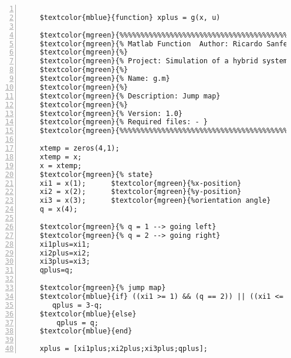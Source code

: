 %  
%  
%  
%  
  
  
\DefineShortVerb[fontfamily=courier,fontseries=m]{\$} 
\DefineShortVerb[fontfamily=courier,fontseries=b]{\#} 
  
\begin{Verbatim}[commandchars=\$\{\},numbers=left,numbersep=2pt] 

    $textcolor{mblue}{function} xplus = g(x, u) 
     
    $textcolor{mgreen}{%%%%%%%%%%%%%%%%%%%%%%%%%%%%%%%%%%%%%%%%%%%%%%%%%%%%%%%%%%%%%%%%%%%%%%%%%%%} 
    $textcolor{mgreen}{% Matlab Function  Author: Ricardo Sanfelice} 
    $textcolor{mgreen}{%} 
    $textcolor{mgreen}{% Project: Simulation of a hybrid system (Vehicle Traveling on a Track)} 
    $textcolor{mgreen}{%} 
    $textcolor{mgreen}{% Name: g.m} 
    $textcolor{mgreen}{%} 
    $textcolor{mgreen}{% Description: Jump map} 
    $textcolor{mgreen}{%} 
    $textcolor{mgreen}{% Version: 1.0} 
    $textcolor{mgreen}{% Required files: - } 
    $textcolor{mgreen}{%%%%%%%%%%%%%%%%%%%%%%%%%%%%%%%%%%%%%%%%%%%%%%%%%%%%%%%%%%%%%%%%%%%%%%%%%%%} 
     
    xtemp = zeros(4,1); 
    xtemp = x; 
    x = xtemp; 
    $textcolor{mgreen}{% state} 
    xi1 = x(1);      $textcolor{mgreen}{%x-position} 
    xi2 = x(2);      $textcolor{mgreen}{%y-position} 
    xi3 = x(3);      $textcolor{mgreen}{%orientation angle} 
    q = x(4);   
     
    $textcolor{mgreen}{% q = 1 --> going left} 
    $textcolor{mgreen}{% q = 2 --> going right} 
    xi1plus=xi1; 
    xi2plus=xi2; 
    xi3plus=xi3; 
    qplus=q; 
     
    $textcolor{mgreen}{% jump map} 
    $textcolor{mblue}{if} ((xi1 >= 1) && (q == 2)) || ((xi1 <= -1) && (q == 1)) 
       qplus = 3-q; 
    $textcolor{mblue}{else} 
        qplus = q; 
    $textcolor{mblue}{end} 
     
    xplus = [xi1plus;xi2plus;xi3plus;qplus];  
\end{Verbatim}  
  
\UndefineShortVerb{\$} 
\UndefineShortVerb{\#} 
 